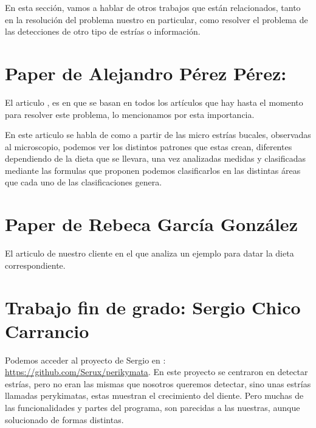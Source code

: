 
En esta sección, vamos a hablar de otros trabajos que están relacionados, tanto en la resolución del problema nuestro en particular, como resolver el problema de las detecciones de otro tipo de estrías o información.

\section{Paper de Alejandro Pérez Pérez:}
El articulo \cite{perez:perez}, es en que se basan en todos los artículos que hay hasta el momento para resolver este problema, lo mencionamos por esta importancia.

En este articulo se habla de como a partir de las micro estrías bucales, observadas al microscopio, podemos ver los distintos patrones que estas crean, diferentes dependiendo de la dieta que se llevara, una vez analizadas medidas y clasificadas mediante las formulas que proponen podemos clasificarlos en las distintas áreas que cada uno de las clasificaciones genera.

\section{Paper de Rebeca García González}
El articulo \cite{Rebeca:garcia} de nuestro cliente en el que analiza un ejemplo para datar la dieta correspondiente.

\section{Trabajo fin de grado: Sergio Chico Carrancio}
Podemos acceder al proyecto de Sergio en : \url{https://github.com/Serux/perikymata}.
En este proyecto se centraron en detectar estrías, pero no eran las mismas que nosotros queremos detectar, sino unas estrías llamadas perykimatas, estas muestran el crecimiento del diente. Pero muchas de las funcionalidades y partes del programa, son parecidas a las nuestras, aunque solucionado de formas distintas.
